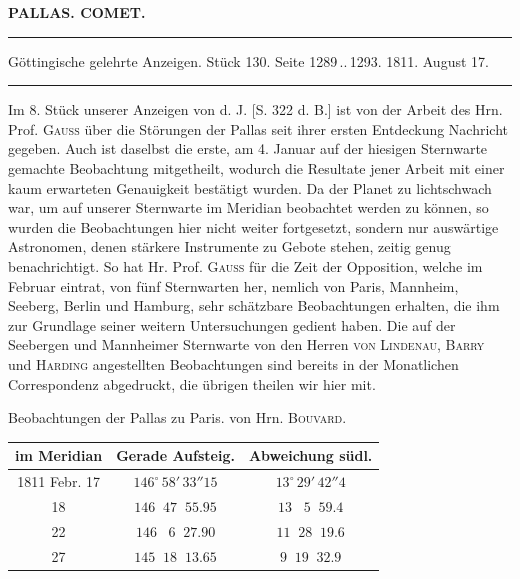\clearpage{}\hypertarget{native-332-lower}{}\label{native-332-lower}
\begin{center}\textbf{PALLAS. COMET.}\par\vspace{4pt}\hrule\vspace{4pt}\fontsize{10}{12}\selectfont Göttingische gelehrte Anzeigen. Stück 130. Seite 1289\,..\,1293. 1811. August 17.\par\vspace{4pt}\hrule\vspace{4pt}\end{center}

\par\indent Im 8. Stück unserer Anzeigen von d. J. [S. 322 d. B.] ist von der Arbeit des Hrn. Prof. \textsc{Gauss} über die Störungen der Pallas seit ihrer ersten Entdeckung Nachricht gegeben. Auch ist daselbst die erste, am 4. Januar auf der hiesigen Sternwarte gemachte Beobachtung mitgetheilt, wodurch die Resultate jener Arbeit mit einer kaum erwarteten Genauigkeit bestätigt wurden. Da der Planet zu lichtschwach war, um auf unserer Sternwarte im Meridian beobachtet werden zu können, so wurden die Beobachtungen hier nicht weiter fortgesetzt, sondern nur auswärtige Astronomen, denen stärkere Instrumente zu Gebote stehen, zeitig genug benachrichtigt. So hat Hr. Prof. \textsc{Gauss} für die Zeit der Opposition, welche im Februar eintrat, von fünf Sternwarten her, nemlich von Paris, Mannheim, Seeberg, Berlin und Hamburg, sehr schätzbare Beobachtungen erhalten, die ihm zur Grundlage seiner weitern Untersuchungen gedient haben. Die auf der Seebergen und Mannheimer Sternwarte von den Herren \textsc{von Lindenau}, \textsc{Barry} und \textsc{Harding} angestellten Beobachtungen sind bereits in der Monatlichen Correspondenz abgedruckt, die übrigen theilen wir hier mit.

\begin{center}\fontsize{10}{12}\selectfont\setlength{\tabcolsep}{4pt}\renewcommand{\arraystretch}{1.15}
Beobachtungen der Pallas zu Paris. von Hrn. \textsc{Bouvard}.

\begin{tabular}{c|c|c}
im Meridian & Gerade Aufsteig. & Abweichung südl. \\
\hline
1811 Febr. 17 & $146^\circ\,58'\,33''15$ & $13^\circ\,29'\,42''4$ \\
18 & $146\;\;47\;\;55.95$ & $13\;\;\;5\;\;59.4$ \\
22 & $146\;\;\;6\;\;27.90$ & $11\;\;28\;\;19.6$ \\
27 & $145\;\;18\;\;13.65$ & $9\;\;19\;\;32.9$ \\
\end{tabular}
\end{center}

